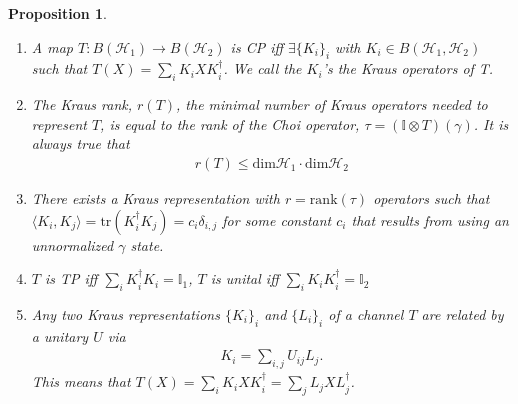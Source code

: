 \documentclass[10pt,oneside,longbibliography]{report}
\newtheorem{proposition}{Proposition}[section]
\begin{document}
\begin{proposition}
\begin{enumerate}
    \item A map $T:B(\mathcal{H}_1)\rightarrow B(\mathcal{H}_2)$ is CP iff $\exists \{K_i\}_i$ with $K_i \in B(\mathcal{H}_1,\mathcal{H}_2)$ such that $T(X) = \sum_i K_i X K_i^{\dagger}$. We call the $K_i$'s the Kraus operators of T. 
    \item The Kraus rank, $r(T)$, the minimal number of Kraus operators needed to represent $T$, is equal to the rank of the Choi operator, $\tau = (\mathbb{I}\otimes T)(\gamma)$. It is always true that 
    \begin{align}
        r(T) \leq \text{dim}\mathcal{H}_1\cdot\text{dim}\mathcal{H}_2
    \end{align}
    \item There exists a Kraus representation with $r=\text{rank}(\tau)$ operators such that $\langle K_i,K_j\rangle=\text{tr}(K_i^{\dagger} K_j) = c_i \delta_{i,j}$ for some constant $c_i$ that results from using an unnormalized $\gamma$ state. 
    \item $T$ is TP iff $\sum_i K_i^{\dagger}K_i = \mathbb{I}_1$, $T$ is unital iff $\sum_i K_i K_i^{\dagger} = \mathbb{I}_2$
    \item Any two Kraus representations $\{K_i\}_i$ and $\{L_i\}_i$ of a channel $T$ are related by a unitary $U$ via 
    \begin{align}
        K_i = \sum_{i,j} U_{ij}L_j.
    \end{align}
    This means that $T(X)=\sum_i K_i X K_i^{\dagger} = \sum_j L_j X L_j^{\dagger}$.
\end{enumerate}
\end{proposition}
\end{document}
